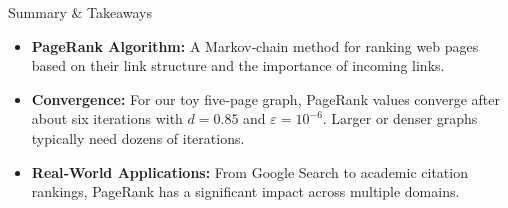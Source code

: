 \documentclass{beamer}
\begin{document}
\begin{frame}{Summary & Takeaways}
\begin{itemize}
  \item \textbf{PageRank Algorithm:} A Markov‑chain method for ranking web pages based on their link structure and the importance of incoming links.
  \item \textbf{Convergence:} For our toy five‑page graph, PageRank values converge after about six iterations with $d=0.85$ and $\varepsilon=10^{-6}$.  Larger or denser graphs typically need dozens of iterations.
  \item \textbf{Real‑World Applications:} From Google Search to academic citation rankings, PageRank has a significant impact across multiple domains.
\end{itemize}
\vspace{1em}
\centering
\end{frame}
\end{document}
